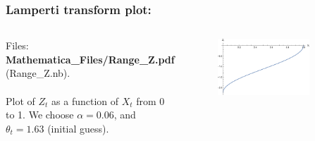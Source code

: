 \documentclass[aspectratio=169]{beamer}\usepackage[utf8]{inputenc}
\begin{document}

\begin{frame}\frametitle{Lamperti transform plot:}

\begin{columns}

Files: \textbf{Mathematica\_Files/Range\_Z.pdf} (Range\_Z.nb).\\
\quad\\
Plot of $Z_t$ as a function of $X_t$ from 0 to 1. We choose $\alpha=0.06$, and $\theta_t=1.63$ (initial guess).

\begin{figure}[ht!]
\centering
\includegraphics[width=0.8\textwidth]{../../Mathematica_Files/Range_Z.pdf}
\end{figure}

\end{columns}

\end{frame}

\end{document}
